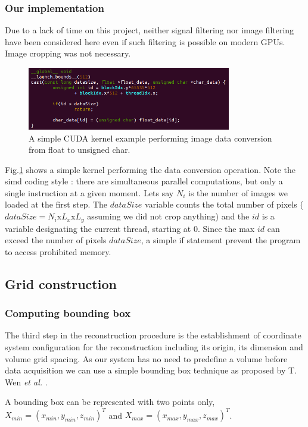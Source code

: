 \documentclass[12pt,journal,compsoc]{IEEEtran}
\begin{document}
\subsubsection{Our implementation}
Due to a lack of time on this project, neither signal filtering nor image filtering have been considered here even if such filtering is possible on modern GPUs. Image cropping was not necessary.

\begin{figure}[!h]
\centering
\includegraphics[width=3.5in]{simple_kernel}
\caption{A simple CUDA kernel example performing image data conversion from float to unsigned char.}
\label{kernel}
\end{figure}

Fig.\ref{kernel} shows a simple kernel performing the data conversion operation. Note the \ac{simd} coding style : there are simultaneous parallel computations, but only a single instruction at a given moment. Lets say $N_i$ is the number of images we loaded at the first step. 
The $dataSize$ variable counts the total number of pixels ($dataSize=N_i$x$L_x$x$L_y$ assuming we did not crop anything) and the $id$ is a variable designating the current thread, starting at 0. Since the max $id$ can exceed the number of pixels $dataSize$, a simple if statement prevent the program to access prohibited memory. 

\subsection{Grid construction}

\subsubsection{Computing bounding box}
The third step in the reconstruction procedure is the establishment of coordinate system configuration for the reconstruction including its origin, its dimension and volume grid spacing. As our system has no need to predefine a volume before data acquisition we can use a simple bounding box technique as proposed by T. Wen \textit{et al.} \cite{2}.

A bounding box can be represented with two points only, $X_{min} = (x_{min},y_{min},z_{min})^T$ and $X_{max} = (x_{max}, y_{max}, z_{max})^T$.
\end{document}
